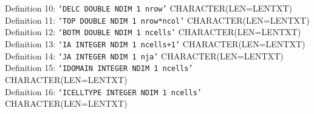 \noindent Definition 10: \texttt{`DELC DOUBLE NDIM 1 nrow'} {\color{red} \footnotesize{CHARACTER(LEN=LENTXT)}} \\
\noindent Definition 11: \texttt{`TOP DOUBLE NDIM 1 nrow*ncol'} {\color{red} \footnotesize{CHARACTER(LEN=LENTXT)}} \\
\noindent Definition 12: \texttt{`BOTM DOUBLE NDIM 1 ncells'} {\color{red} \footnotesize{CHARACTER(LEN=LENTXT)}} \\
\noindent Definition 13: \texttt{`IA INTEGER NDIM 1 ncells+1'} {\color{red} \footnotesize{CHARACTER(LEN=LENTXT)}} \\
\noindent Definition 14: \texttt{`JA INTEGER NDIM 1 nja'} {\color{red} \footnotesize{CHARACTER(LEN=LENTXT)}} \\
\noindent Definition 15: \texttt{`IDOMAIN INTEGER NDIM 1 ncells'} {\color{red} \footnotesize{CHARACTER(LEN=LENTXT)}} \\
\noindent Definition 16: \texttt{`ICELLTYPE INTEGER NDIM 1 ncells'} {\color{red} \footnotesize{CHARACTER(LEN=LENTXT)}} \\

